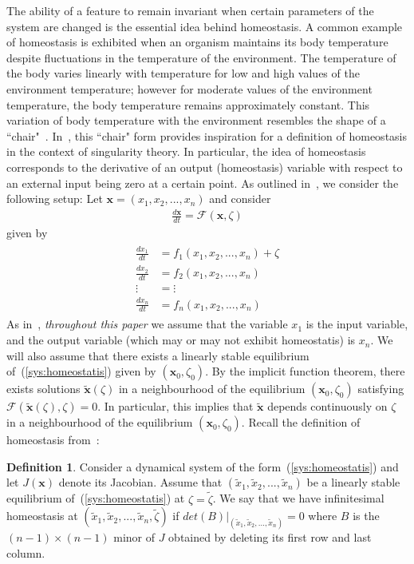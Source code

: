 \documentclass[11pt]{article}
\theoremstyle{plain}
\theoremstyle{definition}
\newtheorem{definition}[theorem]{Definition}
\theoremstyle{remark}
\newcommand\x{\boldsymbol{x}}
\begin{document}
The ability of a feature to remain invariant when certain parameters of the system are changed is the essential idea behind homeostasis. A common example of homeostasis is exhibited when an organism maintains its body temperature despite fluctuations in the temperature of the environment. The temperature of the body varies linearly with temperature for low and high values of the environment temperature; however for moderate values of the environment temperature, the body temperature remains approximately constant. This variation of body temperature with the environment resembles the shape of a ``chair"~\cite{nijhout2004mathematical,nijhout2014homeostasis}. In~\cite{golubitsky2017homeostasis}, this ``chair" form provides inspiration for a definition of homeostasis in the context of singularity theory. In particular, the idea of homeostasis corresponds to the derivative of an output (homeostasis) variable with respect to an external input being zero at a certain point. As outlined in~\cite{golubitsky2017homeostasis}, we consider the following setup: Let $\x=(x_1,x_2,...,x_n)$ and consider
\begin{eqnarray}
\frac{d\x}{dt} = \mathcal{F}(\x,\zeta)
\end{eqnarray}
%
given by 
\begin{align}\label{sys:homeostatis}
\begin{split}
\frac{dx_1}{dt} &= f_1(x_1,x_2,...,x_n) + \zeta \\
\frac{dx_2}{dt} &= f_2(x_1,x_2,...,x_n) \\
\vdots  &= \vdots\\
\frac{dx_n}{dt} &= f_n(x_1,x_2,...,x_n) 
\end{split}
\end{align}
%
As in~\cite{golubitsky2017homeostasis}, \emph{throughout this paper} we assume that the variable $x_1$ is the input variable, and the output variable (which may or may not exhibit homeostatis) is $x_n$. We will also assume that there exists a linearly stable equilibrium of~(\ref{sys:homeostatis}) given by $(\x_0,\zeta_0)$. By the implicit function theorem, there exists solutions $\tilde{\x}(\zeta)$ in a neighbourhood of the equilibrium $(\x_0,\zeta_0)$ satisfying $\mathcal{F}(\tilde{\x}(\zeta),\zeta)=0$. In particular, this implies that $\tilde{\x}$ depends continuously on $\zeta$ in a neighbourhood of the equilibrium $(\x_0,\zeta_0)$. Recall the definition of homeostasis from~\cite{golubitsky2017homeostasis}: 

\begin{definition}\label{defn:homeostasis}
Consider a dynamical system of the form~(\ref{sys:homeostatis}) and let $J(\x)$ denote its Jacobian. Assume that $(\tilde{x}_1,\tilde{x}_2,...,\tilde{x}_n)$ be a linearly stable equilibrium of~(\ref{sys:homeostatis}) at $\zeta=\tilde{\zeta}$. We say that we have infinitesimal homeostasis at $(\tilde{x}_1,\tilde{x}_2,...,\tilde{x}_n,\tilde{\zeta})$ if $det(B)\biggr\rvert _{(\tilde{x}_1,\tilde{x}_2,..., \tilde{x}_n)}=0$ where $B$ is the $(n-1)\times (n-1)$ minor of $J$ obtained by deleting its first row and last column. 
\end{definition}
\end{document}
